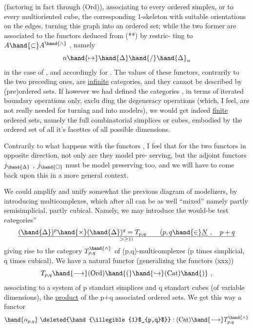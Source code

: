(factoring in fact through (Ord)), associating to every ordered simplex,
or to every multioriented cube, \quad the corresponding 1-skeleton with suitable
orientations on the edges, turning  this graph into an ordered set; \quad while
the two former are associated to the functors deduced from (**) by restric-%
ting to $A \hand{\subset} A^{\hand{\wedge}}$ , \quad namely
\[ n \hand{\mapsto} \hand{\Delta}\hand{/}\hand{\Delta}_n \]
in the case of \hand{$\Delta$}, \quad and accordingly for \hand{$\square$}. \quad The values of these functors,
contrarily to the two preceding ones, \quad are \uline{infinite} categories, \quad and they
cannot be described by  (pre)ordered sets. \quad If however we had defined
the categories \hand{$\Delta$} , \hand{$\square$} \quad in terms of iterated boundary operations only, \quad exclu%
ding the degeneracy operations (which, \quad I feel, \quad are not really needed for
turning \hand{$\Delta^\wedge$} and \hand{$\square^\wedge$} into modelrs), \quad we would get indeed \uline{finite} ordered
sets, \quad namely the full combinatorial simplices or cubes,  embodied by the
ordered set of all it's facettes of all possible dimensions.

Contrarily to what happens with the functors \hand{$\alpha$, $\beta$}, \quad I feel that for
the two functors \hand{$\xi,\eta$} in opposite direction, \quad not only are they model pre-%
serving, \quad but the  adjoint functors \quad $j_{\hand{\Delta}}$ , $j_{\hand{\square}}$ must be model preserving too,
and we will have to come back upon this in a more general context.

We could amplify and unify somewhat the previous diagram of modelizers,
by introducing multicomplexes, \quad which after all can be as well ``mixed''
namely partly semisimplicial, \quad partly cubical. \quad Namely, \quad we may introduce
the would-be test categories'' 
\[ (\hand{\Delta})^p \hand{\times} (\hand{\Delta})^q = T_{p,q} \qquad (p,q \hand{\in} \underline{N} \ , \quad p+q \over{>}{\geq} 1) \]
giving rise to the category \quad $T^{\hand{\wedge}}_{p,q}$  \quad of (p,q)-multicomplexes (p times
simplicial, q times cubical). \quad {} We have a natural functor (generalizing
the functors (xxx))
\[ T_{p,q} \hand{\longrightarrow} \text{(Ord)} \hand{(} \hand{\hookrightarrow} \text{(Cat)} \hand{)} \ , \]
associating to a system of p standart simplices and q standart cubes
(of variable dimensions), \quad the \uline{product} of the p+q associated ordered sets.
We get this way a functor
\[ \hand{\alpha_{p,q}} \ \deleted{\hand{\illegible{1}$_{p,q}$}} : \text{(Cat)} \hand{\longrightarrow} T^{\hand{\wedge}}_{p,q} \]
